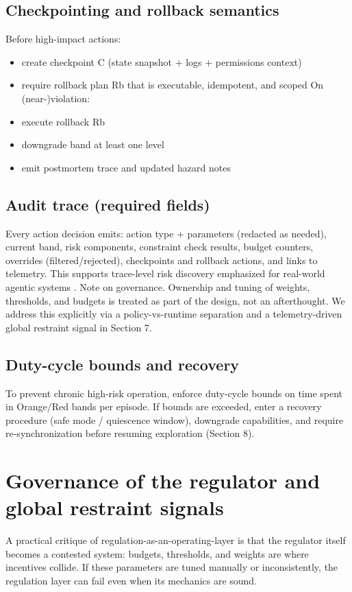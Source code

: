 \documentclass[11pt]{article}
\begin{document}
\subsection{Checkpointing and rollback semantics}
Before high-impact actions:
\begin{itemize}
\item 
create checkpoint C (state snapshot + logs + permissions context)
\item 
require rollback plan Rb that is executable, idempotent, and scoped
On (near-)violation:
\item 
execute rollback Rb
\item 
downgrade band at least one level
\item 
emit postmortem trace and updated hazard notes
\end{itemize}
\subsection{Audit trace (required fields)}
Every action decision emits: action type + parameters (redacted as needed), current band, risk
components, constraint check results, budget counters, overrides (filtered/rejected), checkpoints and
rollback actions, and links to telemetry. This supports trace-level risk discovery emphasized for
real-world agentic systems \citep{ghosh2025agentic}.
Note on governance. Ownership and tuning of weights, thresholds, and budgets is treated as part
of the design, not an afterthought. We address this explicitly via a policy-vs-runtime separation
and a telemetry-driven global restraint signal in Section 7.
\subsection{Duty-cycle bounds and recovery}
To prevent chronic high-risk operation, enforce duty-cycle bounds on time spent in Orange/Red bands
per episode. If bounds are exceeded, enter a recovery procedure (safe mode / quiescence window),
downgrade capabilities, and require re-synchronization before resuming exploration (Section 8).
\section{Governance of the regulator and global restraint signals}
A practical critique of regulation-as-an-operating-layer is that the regulator itself becomes a contested
system: budgets, thresholds, and weights are where incentives collide. If these parameters are tuned
manually or inconsistently, the regulation layer can fail even when its mechanics are sound.
\end{document}
